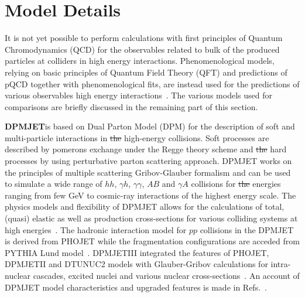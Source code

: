 \documentclass{article}
\providecommand{\DIFadd}[1]{{\protect\color{blue}\uwave{#1}}} %
\providecommand{\DIFdel}[1]{{\protect\color{red}\sout{#1}}}                      %
\providecommand{\DIFaddbegin}{} %
\providecommand{\DIFaddend}{} %
\providecommand{\DIFdelbegin}{} %
\providecommand{\DIFdelend}{} %
\begin{document}
\section{Model Details}\label{sec2}
 It is not yet possible to perform calculations with first principles of Quantum Chromodynamics (QCD) for the observables related to bulk of the produced particles at colliders in high energy interactions. Phenomenological models, relying on basic principles of Quantum Field Theory (QFT) and predictions of pQCD together with phenomenological fits, are instead used for the predictions of various observables high energy interactions~\cite{dEnterria:2011twh}. The various models used for comparisons are briefly discussed in the remaining part of this section.

{\bf DPMJET}\DIFaddbegin \DIFadd{~\mbox{%
\cite{Roesler:2000he} }%
}\DIFaddend is based on Dual Parton Model (DPM) for the description of soft and multi-particle interactions in \DIFdelbegin \DIFdel{the }\DIFdelend high-energy collisions. Soft processes are described by pomerons exchange under the Regge theory scheme and \DIFdelbegin \DIFdel{the }\DIFdelend hard processes by using perturbative parton scattering approach. DPMJET works on the principles of multiple scattering Gribov-Glauber formalism and can be used to simulate a wide range of $hh$, $\gamma h$, $\gamma \gamma$, $AB$ and $\gamma A$ collisions for \DIFdelbegin \DIFdel{the }\DIFdelend energies ranging from few GeV to cosmic-ray interactions of the highest energy scale. The physics models and flexibility of DPMJET allows for the calculations of total, (quasi) elastic as well as production cross-sections for various colliding systems at high energies~\cite{Roesler:2000he}. The hadronic interaction model for $pp$ collisions in the DPMJET is derived from PHOJET while the fragmentation configurations are acceded from PYTHIA Lund model~\cite{ATLAS:2020bhl}. DPMJETIII \DIFaddbegin \DIFadd{used for this study }\DIFaddend integrated the features of PHOJET, DPMJETII and DTUNUC2 models with Glauber-Gribov calculations for intra-nuclear cascades, excited nuclei and various nuclear cross-sections~\cite{Roesler:2000he}. An account of DPMJET model characteristics and upgraded features is made in Refs.~\cite{Roesler:2000he, Bopp:2005cr}. 
\end{document}
